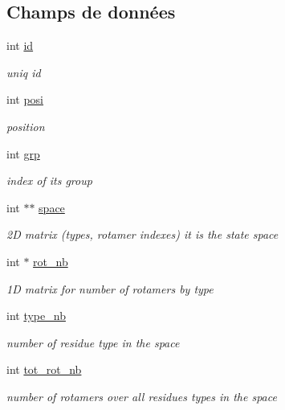 \subsection*{Champs de données}
\begin{DoxyCompactItemize}
\item 
int \hyperlink{struct_p_i_aeacab9a46c42d74eca7e1c74e56b8e8a}{id}
\begin{DoxyCompactList}\small\item\em uniq id \end{DoxyCompactList}\item 
int \hyperlink{struct_p_i_a9e85457e1a500295d0cb90343850477b}{posi}
\begin{DoxyCompactList}\small\item\em position \end{DoxyCompactList}\item 
int \hyperlink{struct_p_i_afd1d054c2fea5717dada3b2560b65018}{grp}
\begin{DoxyCompactList}\small\item\em index of its group \end{DoxyCompactList}\item 
int $\ast$$\ast$ \hyperlink{struct_p_i_a21eeeb2f51ed38c4a9eb79cdc4e2a4be}{space}
\begin{DoxyCompactList}\small\item\em 2\+D matrix (types, rotamer indexes) it is the state space \end{DoxyCompactList}\item 
int $\ast$ \hyperlink{struct_p_i_a1bc33fdfb4ad3f30c03e48d1410031ce}{rot\+\_\+nb}
\begin{DoxyCompactList}\small\item\em 1\+D matrix for number of rotamers by type \end{DoxyCompactList}\item 
int \hyperlink{struct_p_i_a954c178498f0744535e44aa722ee43ef}{type\+\_\+nb}
\begin{DoxyCompactList}\small\item\em number of residue type in the space \end{DoxyCompactList}\item 
int \hyperlink{struct_p_i_a484820c535c3c1c8f9fc4b6550b0d2fb}{tot\+\_\+rot\+\_\+nb}
\begin{DoxyCompactList}\small\item\em number of rotamers over all residues types in the space \end{DoxyCompactList}\item 
$$
\end{DoxyCompactItemize}
